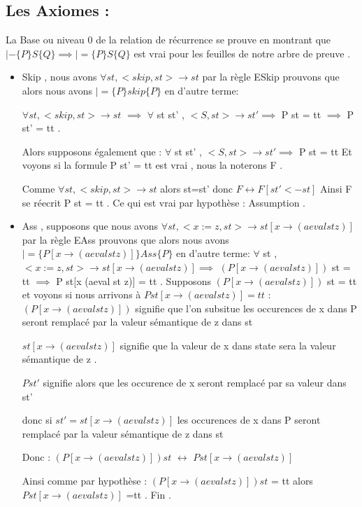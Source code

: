 \documentclass{article}
\begin{document}
\subsection{Les Axiomes :}
La Base ou niveau 0 de la relation de récurrence se prouve en montrant que $|- \{P\}S\{Q\} \implies |= \{P\}S\{Q\}  $ est vrai pour les feuilles de notre arbre de preuve .
\begin{itemize}
    \item Skip , nous avons $\forall st , < skip , st > \rightarrow st  $ par la règle E\textunderscore Skip prouvons que alors nous avons $|= \{P\}skip\{P\}$ en d'autre terme:
    
        $\forall st , < skip , st > \rightarrow st$ $\implies$ $\forall$ st st' , $< S ,st > \rightarrow st' \implies $  P st = tt    $\implies$ P st' = tt . 
        
      Alors supposons également que :
      $\forall$ st st' , $< S ,st > \rightarrow st' \implies $  P st = tt
     Et voyons si la formule P st' = tt est vrai , nous la noterons F . 
     
     
        Comme $\forall st , < skip , st > \rightarrow st$ alors st=st' donc $F \leftrightarrow F[st'<-st]$
        Ainsi F se réecrit P st = tt . Ce qui est vrai par hypothèse : Assumption . 
     
    \item Ass , supposons que nous avons  $\forall st , < x:=z , st > \rightarrow st[x \rightarrow (aeval st z)] $ par la règle E\textunderscore Ass prouvons que alors nous avons $|= \{P[x \rightarrow (aeval st z)]\}Ass\{P\}$ en d'autre terme:
    $\forall$ st  , $< x:=z ,st > \rightarrow st[x \rightarrow (aeval st z)]   \implies $  $(P[x \rightarrow (aeval st z)])$  st = tt    $\implies$ P st[x \rightarrow (aeval st z)] = tt .
    Supposons $(P[x \rightarrow (aeval st z)])$  st = tt et voyons si nous arrivons à $P st[x \rightarrow (aeval st z)] = tt$ :
    $(P[x \rightarrow (aeval st z)])$  signifie que l'on subsitue les occurences de x dans P seront remplacé par la valeur sémantique de z dans st 
    
    
    $st[x \rightarrow (aeval st z)]$ signifie que la valeur de x dans state sera la valeur sémantique de z .

     $P st'$ signifie alors que  les occurence de x seront remplacé par sa valeur dans st' 
    
    donc si $st' = st[x \rightarrow (aeval st z)]$  les occurences de x dans P seront remplacé par la valeur sémantique de z dans st 
    
    Donc :
    $(P[x \rightarrow (aeval st z)]) st $ $\leftrightarrow$  $P st[x \rightarrow (aeval st z)] $
    
    Ainsi comme par hypothèse :  $(P[x \rightarrow (aeval st z)]) st $ = tt alors $P st[x \rightarrow (aeval st z)] $ =tt . Fin .
    
    
\end{itemize}
\end{document}
